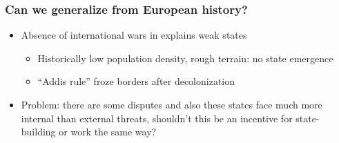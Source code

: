 \documentclass[aspectratio=43, handout]{beamer}
\begin{document}
\begin{frame}
\frametitle{Can we generalize from European history?}
\centering

\begin{minipage}{0.6\textwidth}\centering
  \begin{itemize}
    \item<2-> Absence of international wars in  explains weak states
    \begin{itemize}
      \item Historically low population density, rough terrain: no state emergence
      \item ``Addis rule'' froze borders after decolonization
    \end{itemize}
    \item<3-> Problem: there are some disputes and also these states face much more internal than external threats, shouldn't this be an incentive for state-building or work the same way?
  \end{itemize}
\end{minipage}\hfill
\begin{minipage}{0.4\textwidth}\centering
\end{minipage}

\end{frame}
\end{document}
